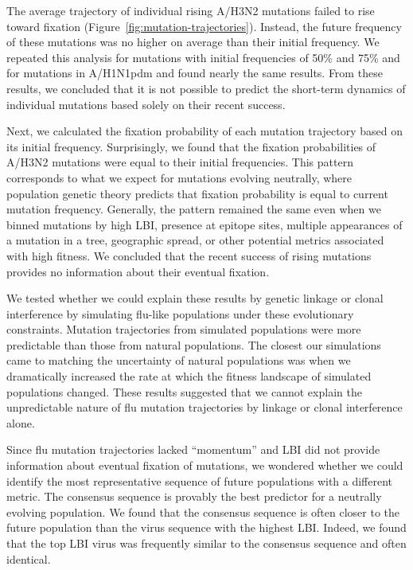 The average trajectory of individual rising A/H3N2 mutations failed to rise toward fixation (Figure~\ref{fig:mutation-trajectories}).
Instead, the future frequency of these mutations was no higher on average than their initial frequency.
We repeated this analysis for mutations with initial frequencies of 50\% and 75\% and for mutations in A/H1N1pdm and found nearly the same results.
From these results, we concluded that it is not possible to predict the short-term dynamics of individual mutations based solely on their recent success.

Next, we calculated the fixation probability of each mutation trajectory based on its initial frequency.
Surprisingly, we found that the fixation probabilities of A/H3N2 mutations were equal to their initial frequencies.
This pattern corresponds to what we expect for mutations evolving neutrally, where population genetic theory predicts that fixation probability is equal to current mutation frequency.
Generally, the pattern remained the same even when we binned mutations by high LBI, presence at epitope sites, multiple appearances of a mutation in a tree, geographic spread, or other potential metrics associated with high fitness.
We concluded that the recent success of rising mutations provides no information about their eventual fixation.

We tested whether we could explain these results by genetic linkage or clonal interference by simulating flu-like populations under these evolutionary constraints.
Mutation trajectories from simulated populations were more predictable than those from natural populations.
The closest our simulations came to matching the uncertainty of natural populations was when we dramatically increased the rate at which the fitness landscape of simulated populations changed.
These results suggested that we cannot explain the unpredictable nature of flu mutation trajectories by linkage or clonal interference alone.

Since flu mutation trajectories lacked ``momentum'' and LBI did not provide information about eventual fixation of mutations, we wondered whether we could identify the most representative sequence of future populations with a different metric.
The consensus sequence is provably the best predictor for a neutrally evolving population.
We found that the consensus sequence is often closer to the future population than the virus sequence with the highest LBI.
Indeed, we found that the top LBI virus was frequently similar to the consensus sequence and often identical.

